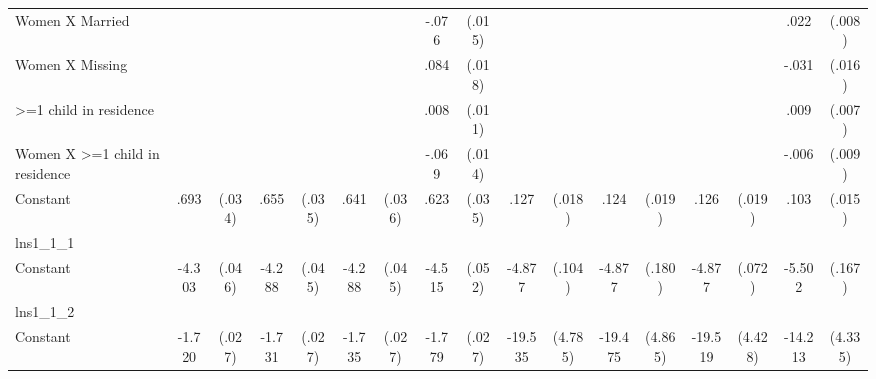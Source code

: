 \begin{table}[htbp]
\begin{tabular}{l*{8}{cc}}
Women X Married &                  &         &                  &         &                  &         &    -.076\sym{***}&   (.015)&                  &         &                  &         &                  &         &     .022\sym{**} &   (.008)\\
Women X Missing &                  &         &                  &         &                  &         &     .084\sym{***}&   (.018)&                  &         &                  &         &                  &         &    -.031\sym{+}  &   (.016)\\
>=1 child in residence&                  &         &                  &         &                  &         &     .008         &   (.011)&                  &         &                  &         &                  &         &     .009         &   (.007)\\
Women X >=1 child in residence&                  &         &                  &         &                  &         &    -.069\sym{***}&   (.014)&                  &         &                  &         &                  &         &    -.006         &   (.009)\\
Constant        &     .693\sym{***}&   (.034)&     .655\sym{***}&   (.035)&     .641\sym{***}&   (.036)&     .623\sym{***}&   (.035)&     .127\sym{***}&   (.018)&     .124\sym{***}&   (.019)&     .126\sym{***}&   (.019)&     .103\sym{***}&   (.015)\\
\hline
lns1\_1\_1        &                  &         &                  &         &                  &         &                  &         &                  &         &                  &         &                  &         &                  &         \\
Constant        &   -4.303\sym{***}&   (.046)&   -4.288\sym{***}&   (.045)&   -4.288\sym{***}&   (.045)&   -4.515\sym{***}&   (.052)&   -4.877\sym{***}&   (.104)&   -4.877\sym{***}&   (.180)&   -4.877\sym{***}&   (.072)&   -5.502\sym{***}&   (.167)\\
\hline
lns1\_1\_2        &                  &         &                  &         &                  &         &                  &         &                  &         &                  &         &                  &         &                  &         \\
Constant        &   -1.720\sym{***}&   (.027)&   -1.731\sym{***}&   (.027)&   -1.735\sym{***}&   (.027)&   -1.779\sym{***}&   (.027)&  -19.535\sym{***}&  (4.785)&  -19.475\sym{***}&  (4.865)&  -19.519\sym{***}&  (4.428)&  -14.213\sym{**} &  (4.335)\\

\end{tabular}
\end{table}
